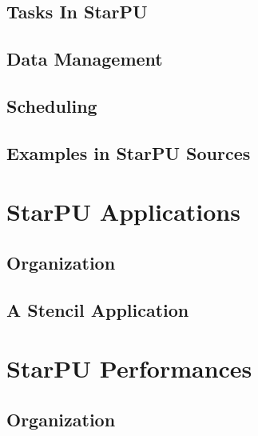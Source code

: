 \chapter{Tasks In StarPU}
\label{TasksInStarPU}
\hypertarget{TasksInStarPU}{}


\chapter{Data Management}
\label{DataManagement}
\hypertarget{DataManagement}{}


\chapter{Scheduling}
\label{Scheduling}
\hypertarget{Scheduling}{}


\chapter{Examples in StarPU Sources}
\label{ExamplesInStarPUSources}
\hypertarget{ExamplesInStarPUSources}{}


\part{StarPU Applications}
\label{StarPUApplications}

\chapter{Organization}
\label{IntroApplications}
\hypertarget{IntroApplications}{}


\chapter{A Stencil Application}
\label{StencilApplication}
\hypertarget{StencilApplication}{}


\part{StarPU Performances}

\chapter{Organization}
\label{IntroPerformances}
\hypertarget{IntroPerformances}{}


